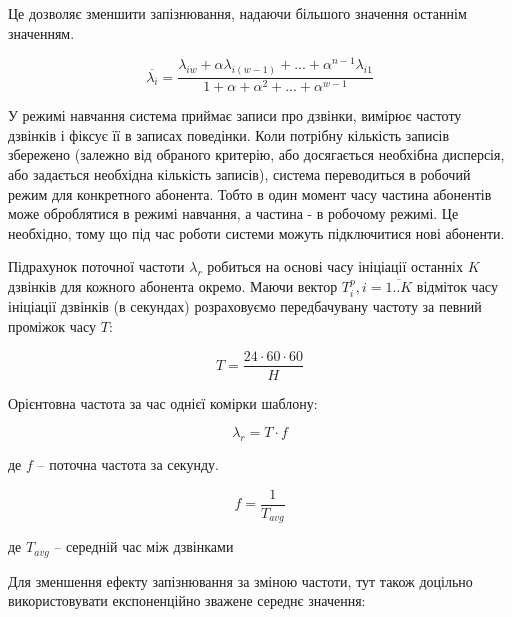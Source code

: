 Це дозволяє зменшити запізнювання, надаючи більшого значення останнім значенням.

\begin{equation}\label{eq:ema_lambda}\overline{{\lambda}_{i}} = \frac{{\lambda}_{i w} + \alpha {\lambda}_{i(w -1)} +...+ {\alpha} ^ {n -1} {\lambda}_{i1}}{1+ \alpha + {\alpha} ^ {2} +...+ {\alpha} ^ {w -1}} \end{equation}

У режимі навчання система приймає записи про дзвінки, вимірює частоту дзвінків і фіксує її в записах поведінки. Коли потрібну кількість записів збережено (залежно від обраного критерію, або досягається необхібна дисперсія, або задається необхідна кількість записів), система переводиться в робочий режим для конкретного абонента. Тобто в один момент часу частина абонентів може оброблятися в режимі навчання, а частина - в робочому режимі. Це необхідно, тому що під час роботи системи можуть підключитися нові абоненти.

Підрахунок поточної частоти $\lambda_{r}$ робиться на основі часу ініціації останніх $K$ дзвінків для кожного абонента окремо. Маючи вектор $T_i^{p}, i = \overline{1..K}$ відміток часу ініціації дзвінків (в секундах) розраховуємо передбачувану частоту за певний проміжок часу $T$:

\begin{equation}\label{eq:time_duration} T = \frac{24 \cdot 60 \cdot 60}{H} \end{equation}

Орієнтовна частота за час однієї комірки шаблону:

\begin{equation}\label{eq:one_freq} \lambda_r = T \cdot f \end{equation}
\begin{ESKDexplanation}
  \item де $f$ -- поточна частота за секунду.
\end{ESKDexplanation}

\begin{equation}\label{eq:cur_freq} f = \frac{1}{T_{avg}} \end{equation}
\begin{ESKDexplanation}
  \item де $T_{avg}$ -- середній час між дзвінками
\end{ESKDexplanation}

Для зменшення ефекту запізнювання за зміною частоти, тут також доцільно використовувати експоненційно зважене середнє значення:


